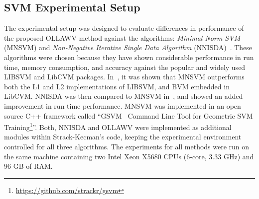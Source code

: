 \documentclass[reqno]{vcuthesis}
\numberwithin{equation}{chapter}
\begin{document}
\subsection{SVM Experimental Setup}\label{subsec:expsvm}
The experimental setup was designed to evaluate differences in performance of the proposed OLLAWV method against the algorithms: \textit{Minimal Norm SVM} (MNSVM) \cite{strack2013geometric} and \textit{Non-Negative Iterative Single Data Algorithm} (NNISDA)~\cite{zigic2016}. These algorithms were chosen because they have shown considerable performance in run time, memory consumption, and accuracy against the popular and widely used LIBSVM and LibCVM packages. In~\cite{strack2013geometric}, it was shown that MNSVM outperforms both the L1 and L2 implementations of LIBSVM, and BVM embedded in LibCVM. NNISDA was then compared to MNSVM in~\cite{zigic2016}, and showed an added improvement in run time performance. MNSVM was implemented in an open source C++ framework called ``GSVM \textendash ~Command Line Tool for Geometric SVM Training\footnote{\url{https://github.com/strackr/gsvm}}''. Both, NNISDA and OLLAWV were implemented as additional modules within Strack-Kecman's code, keeping the experimental environment controlled for all three algorithms. The experiments for all methods were run on the same machine containing two Intel Xeon X5680 CPUs (6-core, 3.33 GHz) and 96 GB of RAM.
\end{document}
